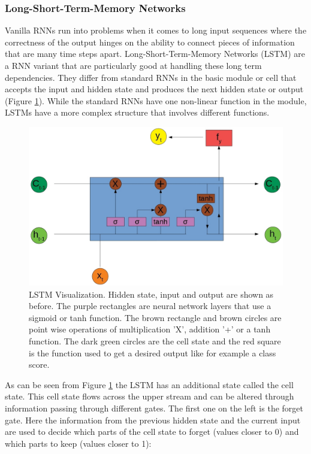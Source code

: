 \documentclass{article}
\begin{document}
\subsubsection{Long-Short-Term-Memory Networks}
Vanilla RNNs run into problems when it comes to long input sequences where the correctness of the output hinges on the ability to connect pieces of information that are many time steps apart. Long-Short-Term-Memory Networks (LSTM) are a RNN variant that are particularly good at handling these long term dependencies. They differ from standard RNNs in the basic module or cell that accepts the input and hidden state and produces the next hidden state or output (Figure \ref{fig:LSTM}). While the standard RNNs have one non-linear function in the module, LSTMs have a more complex structure that involves different functions\cite{Olah}.
\begin{figure}[H]
\begin{center}
\includegraphics[scale=0.3]{rsz_1lstm}
\end{center}
\caption{LSTM Visualization. Hidden state, input and output are shown as before. The purple rectangles are neural network layers that use a sigmoid or tanh function. The brown rectangle and brown circles are point wise operations of multiplication 'X', addition '+' or a tanh function. The dark green circles are the cell state and the red square is the function used to get a desired output like for example a class score.}
\label{fig:LSTM}
\end{figure}  
As can be seen from Figure \ref{fig:LSTM} the LSTM has an additional state called the cell state. This cell state flows across the upper stream and can be altered through information passing through different gates. The first one on the left is the forget gate. Here the information from the previous hidden state and the current input are used to decide which parts of the cell state to forget (values closer to 0) and which parts to keep (values closer to 1):
\end{document}
